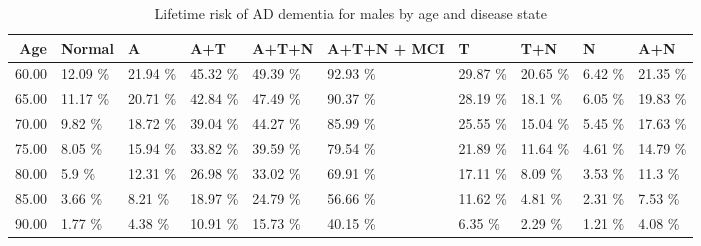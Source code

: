 \begin{table}[ht]
\centering
\begin{tabular}{rlllllllll}
  \hline
Age & Normal & A & A+T & A+T+N & A+T+N + MCI & T & T+N & N & A+N \\ 
  \hline
60.00 & 12.09 \% & 21.94 \% & 45.32 \% & 49.39 \% & 92.93 \% & 29.87 \% & 20.65 \% & 6.42 \% & 21.35 \% \\ 
  65.00 & 11.17 \% & 20.71 \% & 42.84 \% & 47.49 \% & 90.37 \% & 28.19 \% & 18.1 \% & 6.05 \% & 19.83 \% \\ 
  70.00 & 9.82 \% & 18.72 \% & 39.04 \% & 44.27 \% & 85.99 \% & 25.55 \% & 15.04 \% & 5.45 \% & 17.63 \% \\ 
  75.00 & 8.05 \% & 15.94 \% & 33.82 \% & 39.59 \% & 79.54 \% & 21.89 \% & 11.64 \% & 4.61 \% & 14.79 \% \\ 
  80.00 & 5.9 \% & 12.31 \% & 26.98 \% & 33.02 \% & 69.91 \% & 17.11 \% & 8.09 \% & 3.53 \% & 11.3 \% \\ 
  85.00 & 3.66 \% & 8.21 \% & 18.97 \% & 24.79 \% & 56.66 \% & 11.62 \% & 4.81 \% & 2.31 \% & 7.53 \% \\ 
  90.00 & 1.77 \% & 4.38 \% & 10.91 \% & 15.73 \% & 40.15 \% & 6.35 \% & 2.29 \% & 1.21 \% & 4.08 \% \\ 
   \hline
\end{tabular}
\caption{Lifetime risk of AD dementia for males by age and disease state} 
\end{table}
